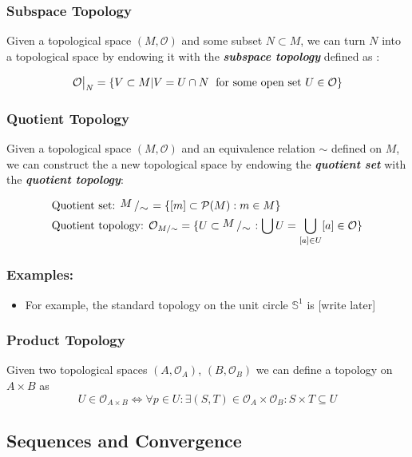 \documentclass{article}
\newcommand{\bigslant}[2]{{\raisebox{.2em}{$#1$}\left/\raisebox{-.2em}{$#2$}\right.}}
\newcommand{\restr}[2]{{%
  \left.\kern-\nulldelimiterspace %
  #1 %
  \vphantom{\big|} %
  \right|_{#2} %
  }}
\begin{document}
\vskip 0.5cm
\subsubsection{Subspace Topology}

Given a topological space $(M, \mathcal{O})$ and some subset $N \subset M$, we can turn $N$ into a topological space by endowing it with the \emph{\textbf{subspace topology}} defined as :

\[ \restr{\mathcal{O}}{N} = \{ V \subset M | V = U \cap N \;\text{ for some open set } U \in \mathcal{O}  \} \]

\vskip 0.5cm
\subsubsection{Quotient Topology}
Given a topological space $(M, \mathcal{O})$ and an equivalence relation $\sim$ defined on $M$, we can construct the a new topological space by endowing the \emph{\textbf{quotient set}} with the \emph{\textbf{quotient topology}}:

\begin{align*}
  &\text{Quotient set: } \bigslant{M}{\sim} = \{ [m] \subset \mathcal{P}(M) : m \in M \} \\
  &\text{Quotient topology: } \mathcal{O}_{M / \sim} = \{ U \subset \bigslant{M}{\sim} : \bigcup U = \bigcup_{[a] \in U} [a] \in \mathcal{O}\} 
\end{align*}

\subsubsection*{Examples:}
\begin{itemize}
  \item For example, the standard topology on the unit circle $\mathbb{S}^1$ is [write later]
\end{itemize}

\vskip 0.5cm
\subsubsection{Product Topology}
Given two topological spaces $(A, \mathcal{O}_A)$, $(B, \mathcal{O}_B)$ we can define a topology on $A \times B$ as 
\[ U \in \mathcal{O}_{A \times B} \iff \forall p \in U : \exists (S,T) \in \mathcal{O}_A \times \mathcal{O}_B : S \times T \subseteq U \]

\vskip 0.5cm
\subsection{Sequences and Convergence}
\end{document}
